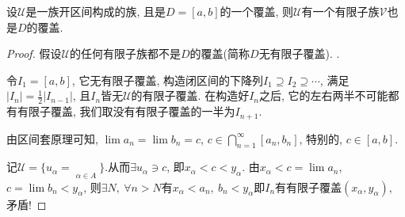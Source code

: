 \begin{theorem}
    设$\mathscr{U}$是一族开区间构成的族, 且是$D=[a,b]$的一个覆盖, 则$\mathscr{U}$有一个有限子族$\mathscr{V}$也是$D$的覆盖.
\end{theorem}
\begin{proof}
    假设$\mathscr{U}$的任何有限子族都不是$D$的覆盖(简称$D$无有限子覆盖). .
    
    令$I_1 = \left[ a,b \right] $, 它无有限子覆盖, 构造闭区间的下降列$I_1 \supseteq I_2 \supseteq \cdots $, 满足$\left| I_n \right| = \frac{1}{2} \left| I_{n-1} \right| $, 且$I_n$皆无$\mathscr{U}$的有限子覆盖. 在构造好$I_n$之后, 它的左右两半不可能都有有限子覆盖, 我们取没有有限子覆盖的一半为$I_{n+1}$.

    由区间套原理可知, $\lim a_n = \lim b_n = c$, $c \in \bigcap_{n=1} ^{\infty} \left[ a_n, b_n \right] $, 特别的, $c \in \left[ a,b \right] $. 
    
    记$\mathscr{U} = \{ u_{\alpha} = \mathop{\left( x_{\alpha}, y_{\alpha} \right) }\limits^{}_{\alpha \in A} \}$.从而$\exists u_{\alpha} \ni c$, 即$x_{\alpha} < c < y_{\alpha}$. 由$x_{\alpha} < c = \lim a_n$, $c = \lim b_n < y_{\alpha}$, 则$\exists N, \ \forall n > N$有$x_{\alpha} < a_n, \ b_n < y_{\alpha}$即$I_n$有有限子覆盖$\left( x_\alpha, y_\alpha \right) $, 矛盾!


\end{proof}
